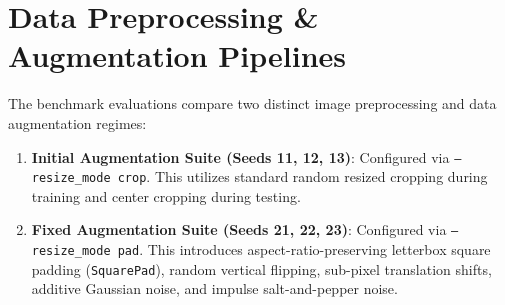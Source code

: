 \documentclass[letterpaper,11pt,leqno]{article}
\begin{document}
\section{Data Preprocessing \& Augmentation Pipelines}

The benchmark evaluations compare two distinct image preprocessing and data augmentation regimes:
\begin{enumerate}
    \item \textbf{Initial Augmentation Suite (Seeds 11, 12, 13)}: Configured via \texttt{--resize\_mode crop}. This utilizes standard random resized cropping during training and center cropping during testing.
    \item \textbf{Fixed Augmentation Suite (Seeds 21, 22, 23)}: Configured via \texttt{--resize\_mode pad}. This introduces aspect-ratio-preserving letterbox square padding (\texttt{SquarePad}), random vertical flipping, sub-pixel translation shifts, additive Gaussian noise, and impulse salt-and-pepper noise.
\end{enumerate}
\end{document}
